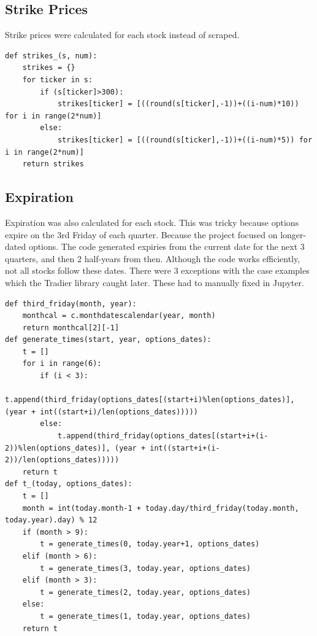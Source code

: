\documentclass{article}
\begin{document}
\subsection{Strike Prices}
\begin{flushleft}
Strike prices were calculated for each stock instead of scraped. 
\begin{verbatim}
def strikes_(s, num):
    strikes = {}
    for ticker in s:
        if (s[ticker]>300):
            strikes[ticker] = [((round(s[ticker],-1))+((i-num)*10)) for i in range(2*num)]
        else:
            strikes[ticker] = [((round(s[ticker],-1))+((i-num)*5)) for i in range(2*num)]
    return strikes
\end{verbatim}
\end{flushleft}

\subsection{Expiration}
\begin{flushleft}
Expiration was also calculated for each stock. This was tricky because options expire on the 3rd Friday of each quarter. Because the project focused on longer-dated options. The code generated expiries from the current date for the next 3 quarters, and then 2 half-years from then. Although the code works efficiently, not all stocks follow these dates. There were 3 exceptions with the case examples which the Tradier library caught later. These had to manually fixed in Jupyter. 
\begin{verbatim}
def third_friday(month, year):
    monthcal = c.monthdatescalendar(year, month)
    return monthcal[2][-1]
def generate_times(start, year, options_dates):
    t = []
    for i in range(6):
        if (i < 3):
            t.append(third_friday(options_dates[(start+i)%len(options_dates)], (year + int((start+i)/len(options_dates)))))
        else:
            t.append(third_friday(options_dates[(start+i+(i-2))%len(options_dates)], (year + int((start+i+(i-2))/len(options_dates)))))
    return t
def t_(today, options_dates):
    t = []
    month = int(today.month-1 + today.day/third_friday(today.month, today.year).day) % 12
    if (month > 9):
        t = generate_times(0, today.year+1, options_dates)
    elif (month > 6):
        t = generate_times(3, today.year, options_dates)
    elif (month > 3):
        t = generate_times(2, today.year, options_dates)
    else:
        t = generate_times(1, today.year, options_dates)
    return t
\end{verbatim}
\end{flushleft}
\end{document}
